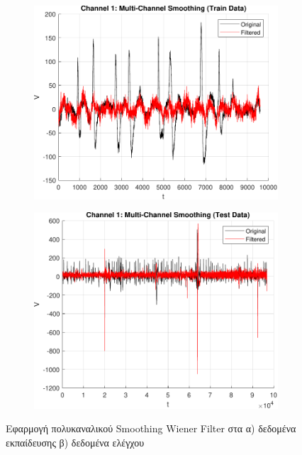 \documentclass[12pt]{article} %
\begin{document}
\begin{figure}[htbp]
    \centering
    \begin{subfigure}[b]{0.45\textwidth}
        \includegraphics[width=\textwidth]{plot/multi_channel_smoothing_train.pdf}
        \caption{}
        \label{fig:multi_channel_smoothing_train}
    \end{subfigure}
    \hfill
    \begin{subfigure}[b]{0.45\textwidth}
        \includegraphics[width=\textwidth]{plot/multi_channel_smoothing_test.pdf}
        \caption{}
        \label{fig:multi_channel_smoothing_test}
    \end{subfigure}

    \caption{Εφαρμογή πολυκαναλικού Smoothing Wiener Filter 
    στα α) δεδομένα εκπαίδευσης β) δεδομένα ελέγχου}
    \label{fig:multi_channel_smoothing}
\end{figure}
\end{document}
